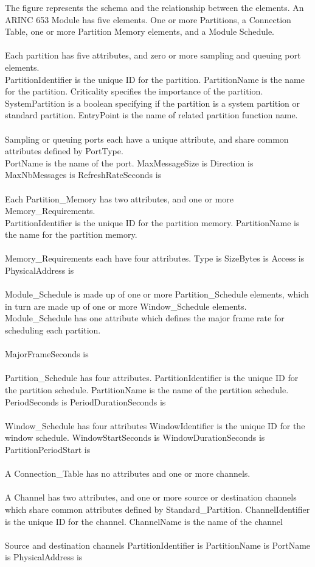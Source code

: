 The figure represents the schema and the 
relationship between the elements. 
An ARINC 653 Module has five elements. 
One or more Partitions, a Connection Table, 
one or more Partition Memory elements, and 
a Module Schedule.
\\\\
Each partition has five attributes, and zero 
or more sampling and queuing port elements. 
\\
PartitionIdentifier is the unique ID for the partition. 
PartitionName is the name for the partition. 
Criticality specifies the importance of the partition.
SystemPartition is a boolean specifying if the partition 
is a system partition or standard partition. 
EntryPoint is the name of related partition function name.
\\\\
Sampling or queuing ports each have a unique 
attribute, and share common attributes defined 
by PortType.
\\
PortName is the name of the port. 
MaxMessageSize is
Direction is 
MaxNbMessages is
RefreshRateSeconds is
\\\\
Each Partition\_Memory has two attributes, 
and one or more Memory\_Requirements.
\\
PartitionIdentifier is the unique ID for the partition memory.
PartitionName is the name for the partition memory.
\\\\
Memory\_Requirements each have four attributes.
Type is
SizeBytes is 
Access is 
PhysicalAddress is
\\\\
Module\_Schedule is made up of one or more Partition\_Schedule elements, which in turn are made up of one or more Window\_Schedule elements. Module\_Schedule has one attribute which defines the major frame rate for scheduling each partition. 
\\\\
MajorFrameSeconds is
\\\\
Partition\_Schedule has four attributes.
PartitionIdentifier is the unique ID for the partition schedule.
PartitionName is the name of the partition schedule. 
PeriodSeconds is
PeriodDurationSeconds is
\\\\
Window\_Schedule has four attributes
WindowIdentifier is the unique ID for the window schedule. 
WindowStartSeconds is 
WindowDurationSeconds is 
PartitionPeriodStart is
\\\\
A Connection\_Table has no attributes and one or more channels.
\\\\
A Channel has two attributes, and one or more source or destination channels which share common attributes defined by Standard\_Partition.
ChannelIdentifier is the unique ID for the channel. 
ChannelName is the name of the channel
\\\\
Source and destination channels
PartitionIdentifier is 
PartitionName is 
PortName is 
PhysicalAddress is
\\\\
